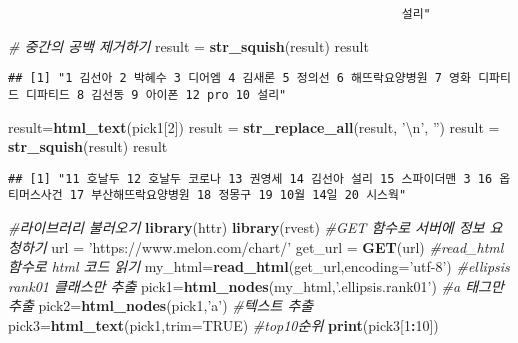 \documentclass[
]{article}
\newenvironment{Shaded}{\begin{snugshade}}{\end{snugshade}}
\newcommand{\CharTok}[1]{\textcolor[rgb]{0.31,0.60,0.02}{#1}}
\newcommand{\CommentTok}[1]{\textcolor[rgb]{0.56,0.35,0.01}{\textit{#1}}}
\newcommand{\DataTypeTok}[1]{\textcolor[rgb]{0.13,0.29,0.53}{#1}}
\newcommand{\DecValTok}[1]{\textcolor[rgb]{0.00,0.00,0.81}{#1}}
\newcommand{\KeywordTok}[1]{\textcolor[rgb]{0.13,0.29,0.53}{\textbf{#1}}}
\newcommand{\NormalTok}[1]{#1}
\newcommand{\OperatorTok}[1]{\textcolor[rgb]{0.81,0.36,0.00}{\textbf{#1}}}
\newcommand{\OtherTok}[1]{\textcolor[rgb]{0.56,0.35,0.01}{#1}}
\newcommand{\StringTok}[1]{\textcolor[rgb]{0.31,0.60,0.02}{#1}}
\begin{document}
\begin{verbatim}
                                                       설리"
\end{verbatim}

\begin{Shaded}
\begin{Highlighting}[]
\CommentTok{# 중간의 공백 제거하기}
\NormalTok{result =}\StringTok{ }\KeywordTok{str_squish}\NormalTok{(result)}
\NormalTok{result}
\end{Highlighting}
\end{Shaded}

\begin{verbatim}
## [1] "1 김선아 2 박혜수 3 디어엠 4 김새론 5 정의선 6 해뜨락요양병원 7 영화 디파티드 디파티드 8 김선동 9 아이폰 12 pro 10 설리"
\end{verbatim}

\begin{Shaded}
\begin{Highlighting}[]
\NormalTok{result=}\KeywordTok{html_text}\NormalTok{(pick1[}\DecValTok{2}\NormalTok{])}
\NormalTok{result =}\StringTok{ }\KeywordTok{str_replace_all}\NormalTok{(result, }\StringTok{'}\CharTok{\textbackslash{}n}\StringTok{'}\NormalTok{, }\StringTok{''}\NormalTok{)}
\NormalTok{result =}\StringTok{ }\KeywordTok{str_squish}\NormalTok{(result)}
\NormalTok{result}
\end{Highlighting}
\end{Shaded}

\begin{verbatim}
## [1] "11 호날두 12 호날두 코로나 13 권영세 14 김선아 설리 15 스파이더맨 3 16 옵티머스사건 17 부산해뜨락요양병원 18 정몽구 19 10월 14일 20 시스웍"
\end{verbatim}

\begin{Shaded}
\begin{Highlighting}[]
\CommentTok{#라이브러리 불러오기}
\KeywordTok{library}\NormalTok{(httr)}
\KeywordTok{library}\NormalTok{(rvest)}
\CommentTok{#GET 함수로 서버에 정보 요청하기}
\NormalTok{url =}\StringTok{ 'https://www.melon.com/chart/'}
\NormalTok{get_url =}\StringTok{ }\KeywordTok{GET}\NormalTok{(url)}
\CommentTok{#read_html 함수로 html 코드 읽기}
\NormalTok{my_html=}\KeywordTok{read_html}\NormalTok{(get_url,}\DataTypeTok{encoding=}\StringTok{'utf-8'}\NormalTok{)}
\CommentTok{#ellipsis rank01 클래스만 추출}
\NormalTok{pick1=}\KeywordTok{html_nodes}\NormalTok{(my_html,}\StringTok{'.ellipsis.rank01'}\NormalTok{)}
\CommentTok{#a 태그만 추출}
\NormalTok{pick2=}\KeywordTok{html_nodes}\NormalTok{(pick1,}\StringTok{'a'}\NormalTok{)}
\CommentTok{#텍스트 추출}
\NormalTok{pick3=}\KeywordTok{html_text}\NormalTok{(pick1,}\DataTypeTok{trim=}\OtherTok{TRUE}\NormalTok{)}
\CommentTok{#top10순위}
\KeywordTok{print}\NormalTok{(pick3[}\DecValTok{1}\OperatorTok{:}\DecValTok{10}\NormalTok{])}
\end{Highlighting}
\end{Shaded}
\end{document}
